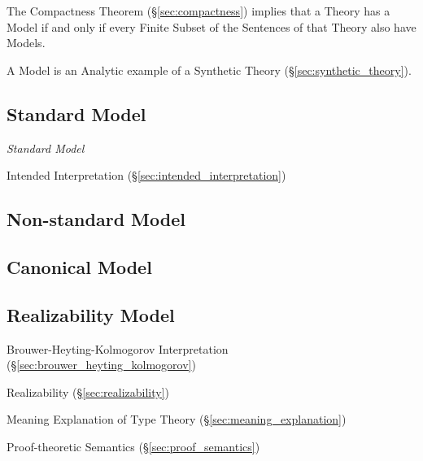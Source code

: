 The Compactness Theorem (\S\ref{sec:compactness}) implies that a
Theory has a Model if and only if every Finite Subset of the Sentences
of that Theory also have Models.

A Model is an Analytic example of a Synthetic Theory
(\S\ref{sec:synthetic_theory}). \cite{shulman15}



\subsection{Standard Model}\label{sec:standard_model}

\emph{Standard Model}

Intended Interpretation (\S\ref{sec:intended_interpretation})



\subsection{Non-standard Model}\label{sec:nonstandard_model}

\subsection{Canonical Model}\label{sec:canonical_model}

\subsection{Realizability Model}\label{sec:realizability_model}

Brouwer-Heyting-Kolmogorov Interpretation
(\S\ref{sec:brouwer_heyting_kolmogorov})

Realizability (\S\ref{sec:realizability})

Meaning Explanation of Type Theory (\S\ref{sec:meaning_explanation})

Proof-theoretic Semantics (\S\ref{sec:proof_semantics})



